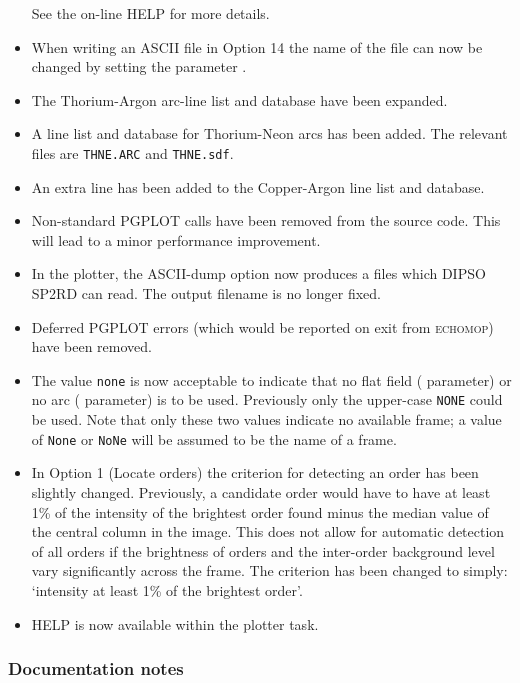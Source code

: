 \documentclass[twoside,11pt,nolof]{starlink}
\begin{document}
\begin{itemize}
   See the on-line HELP for more details.
\item When writing an ASCII file in Option 14 the name of the file can
   now be changed by setting the parameter
   .
\item The Thorium-Argon arc-line list and database have been expanded.
\item A line list and database for Thorium-Neon arcs has been added.
   The relevant files are \texttt{THNE.ARC} and \texttt{THNE.sdf}.
\item An extra line has been added to the Copper-Argon line list and
   database.
\item Non-standard PGPLOT calls have been removed from the source code.
   This will lead to a minor performance improvement.
\item In the plotter, the ASCII-dump option now produces a files which
   DIPSO SP2RD can read.  The output filename is no longer fixed.
\item Deferred PGPLOT errors (which would be reported on exit from
   \textsc{echomop}) have been removed.
\item The value \texttt{none} is now acceptable to indicate that no flat
   field ( parameter) or no arc
   ( parameter) is to  be used.
   Previously only the upper-case \texttt{NONE} could be used.  Note that
   only these two values indicate no available frame; a value of
   \texttt{None} or \texttt{NoNe} will be assumed to be the name of a frame.
\item In Option 1 (Locate orders) the criterion for detecting an order
   has been slightly changed.  Previously, a candidate order would
   have to have at least 1\% of the intensity of the brightest order
   found minus the median value of the central column in the image.
   This does not allow for automatic detection of all orders if the
   brightness of orders and the inter-order background level vary
   significantly across the frame.  The criterion has been changed
   to simply: `intensity at least 1\% of the brightest order'.
\item HELP is now available within the plotter task.
\end{itemize}

\subsubsection{Documentation notes}
\end{document}
